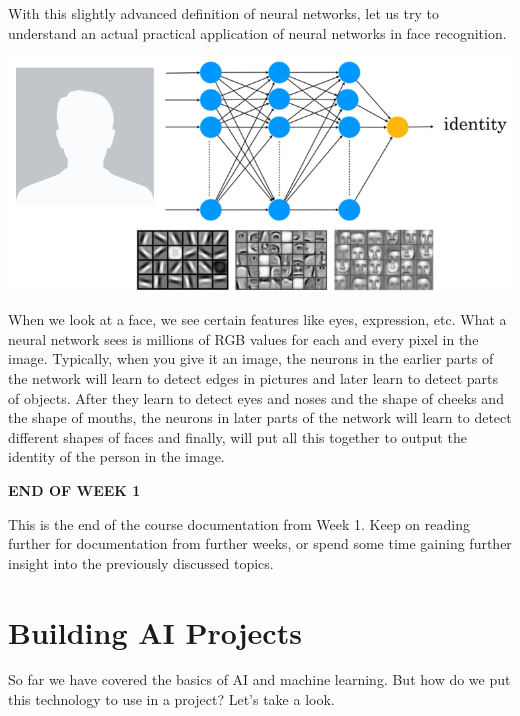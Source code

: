 \documentclass{article}[a4paper,12pt]
\theoremstyle{definition}
\begin{document}
With this slightly advanced definition of neural networks, let us try to understand an actual practical application of neural networks in face recognition. 
\begin{center}\includegraphics{face_recognition.png}\end{center}
When we look at a face, we see certain features like eyes, expression, etc. What a neural network sees is millions of RGB values for each and every pixel in the image. Typically, when you give it an image, the neurons in the earlier parts of the network will learn to detect edges in pictures and later learn to detect parts of objects. After they learn to detect eyes and noses and the shape of cheeks and the shape of mouths, the neurons in later parts of the network will learn to detect different shapes of faces and finally, will put all this together to output the identity of the person in the image.

\hrulefill
\begin{center}\textbf{END OF WEEK 1}\end{center}
This is the end of the course documentation from Week 1. Keep on reading further for documentation from further weeks, or spend some time gaining further insight into the previously discussed topics.

\hrulefill
\section{Building AI Projects}
So far we have covered the basics of AI and machine learning. But how do we put this technology to use in a project? Let's take a look.
\end{document}
